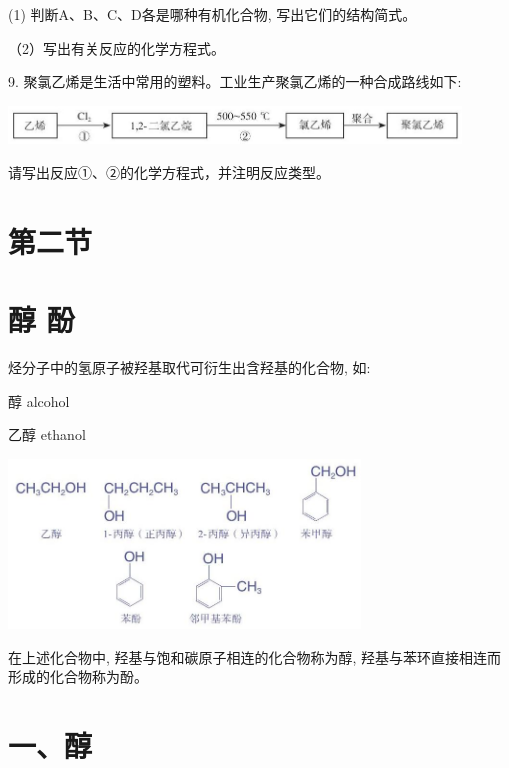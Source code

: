 \documentclass[10pt]{article}
\begin{document}
(1) 判断A、B、C、D各是哪种有机化合物, 写出它们的结构简式。

（2）写出有关反应的化学方程式。

9. 聚氯乙烯是生活中常用的塑料。工业生产聚氯乙烯的一种合成路线如下:

\begin{center}
\includegraphics[max width=0.9\textwidth]{images/0190efc5-b58a-7c43-bfb0-e0a030df9cfd_63_583522.jpg}
\end{center}

请写出反应①、②的化学方程式，并注明反应类型。

\section*{第二节}

\section*{醇 酚}

烃分子中的氢原子被羟基取代可衍生出含羟基的化合物, 如:

\begin{mdframed}

醇 alcohol

乙醇 ethanol

\end{mdframed}

\begin{center}
\includegraphics[max width=0.7\textwidth]{images/0190efc5-b58a-7c43-bfb0-e0a030df9cfd_64_464569.jpg}
\end{center}

在上述化合物中, 羟基与饱和碳原子相连的化合物称为醇, 羟基与苯环直接相连而形成的化合物称为酚。

\section*{一、醇}
\end{document}
